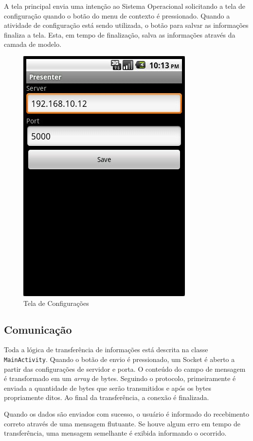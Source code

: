 \documentclass{article}
\begin{document}
A tela principal envia uma intenção ao Sistema Operacional solicitando a tela de
configuração quando o botão do menu de contexto é pressionado. Quando a
atividade de configuração está sendo utilizada, o botão para salvar as
informações finaliza a tela. Esta, em tempo de finalização, salva as informações
através da camada de modelo.

\begin{figure}
    \centering{}
    \includegraphics[scale=0.3]{screenshot03-config.jpg}
    \caption{Tela de Configurações}
    \label{fig:config}
\end{figure}

\subsection{Comunicação}

Toda a lógica de transferência de informações está descrita na classe
\texttt{MainActivity}. Quando o botão de envio é pressionado, um Socket é aberto
a partir das configurações de servidor e porta. O conteúdo do campo de
mensagem é transformado em um \emph{array} de bytes. Seguindo o protocolo,
primeiramente é enviada a quantidade de bytes que serão transmitidos e após os
bytes propriamente ditos. Ao final da transferência, a conexão é finalizada.

Quando os dados são enviados com sucesso, o usuário é informado do recebimento
correto através de uma mensagem flutuante. Se houve algum erro em tempo de
transferência, uma mensagem semelhante é exibida informando o ocorrido.
\end{document}
